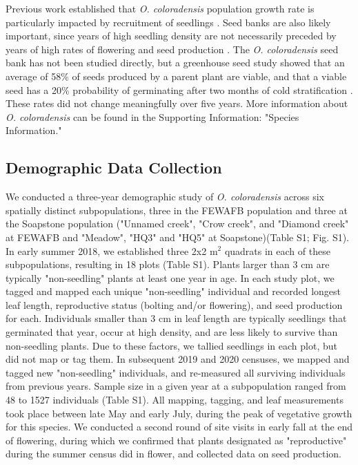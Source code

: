 \documentclass[12pt, letterpaper]{article}
\begin{document}
Previous work established that \textit{O. coloradensis} population growth rate is particularly impacted by recruitment of seedlings \cite{Floyd1998}. Seed banks are also likely important, since years of high seedling density are not necessarily preceded by years of high rates of flowering and seed production \cite{Munk2002RosetteSpecies, Heidel202133-YearWyoming}. The \textit{O. coloradensis} seed bank has not been studied directly, but a greenhouse seed study showed that an average of 58\% of seeds produced by a parent plant are viable, and that a viable seed has a 20\% probability of germinating after two months of cold stratification \cite{Burgess2005CapsuleColoradensis}. These rates did not change meaningfully over five years. More information about \textit{O. coloradensis} can be found in the Supporting Information: "Species Information."

\subsection{Demographic Data Collection}
 We conducted a three-year demographic study of \textit{O. coloradensis} across six spatially distinct subpopulations, three in the FEWAFB population and three at the Soapstone population ("Unnamed creek", "Crow creek", and "Diamond creek" at FEWAFB and "Meadow", "HQ3" and "HQ5" at Soapstone)(Table S1; Fig. S1). In early summer 2018, we established three 2\textsf{x}2 m$^2$ quadrats in each of these subpopulations, resulting in 18 plots (Table S1). Plants larger than 3 cm are typically "non-seedling" plants at least one year in age. In each study plot, we tagged and mapped each unique "non-seedling" individual and recorded longest leaf length, reproductive status (bolting and/or flowering), and seed production for each. Individuals smaller than 3 cm in leaf length are typically seedlings that germinated that year, occur at high density, and are less likely to survive than non-seedling plants. Due to these factors, we tallied seedlings in each plot, but did not map or tag them. In subsequent 2019 and 2020 censuses, we mapped and tagged new "non-seedling" individuals, and re-measured all surviving individuals from previous years. Sample size in a given year at a subpopulation ranged from 48 to 1527 individuals (Table S1). All mapping, tagging, and leaf measurements took place between late May and early July, during the peak of vegetative growth for this species. We conducted a second round of site visits in early fall at the end of flowering, during which we confirmed that plants  designated as "reproductive" during the summer census did in flower, and collected data on seed production. 
 
\end{document}
